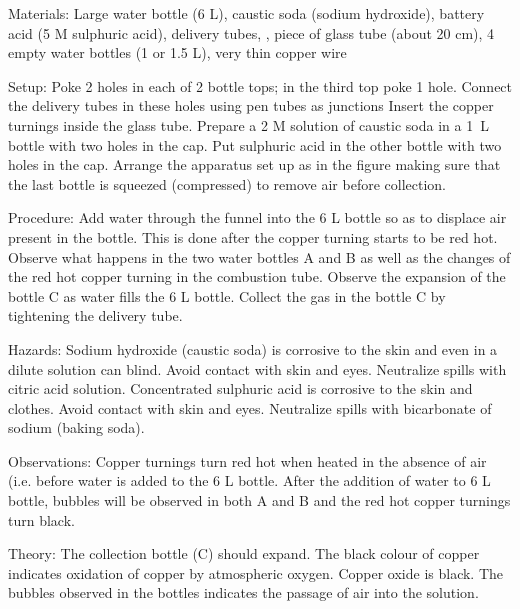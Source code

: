 \begin{multicols}{2}

\begin{description*}
\item[Materials:]{Large water bottle (6 L), caustic soda (sodium hydroxide), battery acid (5 M
sulphuric acid), delivery tubes, , piece of glass tube (about 20
cm), 4 empty water bottles (1 or 1.5 L), very thin copper wire}
\item[Setup:]{Poke 2 holes in each of 2 bottle tops; in the third top poke 1 hole. Connect the delivery tubes in these holes using pen tubes as
junctions Insert the copper turnings inside the glass tube. Prepare a 2 M solution of caustic soda in a 1~L bottle with two holes in the cap. Put sulphuric acid in the other bottle with two holes in the cap.
Arrange the apparatus set up as in the figure making sure that the last
bottle is squeezed (compressed) to remove air before collection.}
\item[Procedure:]{Add water through the funnel into the 6 L bottle so as to displace air
present in the bottle. This is done after the copper turning starts
to be red hot. Observe what happens in the two water bottles A and B as well as the
changes of the red hot copper turning in the combustion tube. 
Observe the expansion of the bottle C as water fills the 6 L bottle. Collect the gas in the bottle C by tightening the delivery tube.}
\item[Hazards:]{Sodium hydroxide (caustic soda) is corrosive to the skin and even in a
dilute solution can blind. Avoid contact with skin and eyes. Neutralize
spills with citric acid solution. Concentrated sulphuric acid is
corrosive to the skin and clothes. Avoid contact with skin and eyes.
Neutralize spills with bicarbonate of sodium (baking soda).}
\item[Observations:]{Copper turnings turn red hot when heated in the absence of air (i.e. before
water is added to the 6 L bottle. After the addition of water to 6 L bottle,
bubbles will be observed in both A and B and the red hot copper turnings
turn black. }
\item[Theory:]{The collection bottle (C) should expand. The black colour of
copper indicates oxidation of copper by atmospheric oxygen. Copper oxide
is black. The bubbles observed in the bottles indicates the passage of air into
the solution.}
\end{description*}


\end{multicols}
